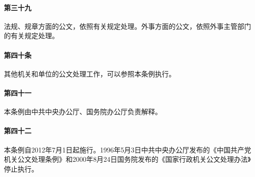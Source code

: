 \documentclass{gbt9704}
\begin{document}
\paragraph{第三十九}法规、规章方面的公文，依照有关规定处理。外事方面的公文，依照外事主管部门的有关规定处理。

\paragraph{第四十条}
其他机关和单位的公文处理工作，可以参照本条例执行。

\paragraph{第四十一}本条例由中共中央办公厅、国务院办公厅负责解释。

\paragraph{第四十二}本条例自2012年7月1日起施行。1996年5月3日中共中央办公厅发布的《中国共产党机关公文处理条例》和2000年8月24日国务院发布的《国家行政机关公文处理办法》停止执行。
\end{document}
